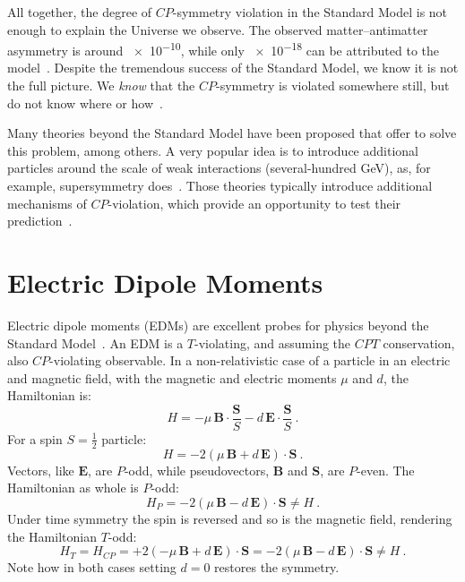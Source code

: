 All together, the degree of $CP$-symmetry violation in the Standard Model is not enough to explain the Universe we observe. The observed matter--antimatter asymmetry is around \num{e-10}, while only \num{e-18} can be attributed to the model~\cite{Riotto1999}. Despite the tremendous success of the Standard Model, we know it is not the full picture. We \emph{know} that the $CP$-symmetry is violated somewhere still, but do not know where or how~\cite{Pospelov2005}.%

Many theories beyond the Standard Model have been proposed that offer to solve this problem, among others. A very popular idea is to introduce additional particles around the scale of weak interactions (several-hundred GeV), as, for example, supersymmetry does~\cite{Supersymmetry}. Those theories typically introduce additional mechanisms of $CP$-violation, which provide an opportunity to test their prediction~\cite{Ellis1989}.



\section{Electric Dipole Moments}
Electric dipole moments (EDMs) are excellent probes for physics beyond the Standard Model~\cite{Pospelov2005}. An EDM is a $T$-violating, and assuming the $CPT$ conservation, also $CP$-violating observable. In a non-relativistic case of a particle in an electric and magnetic field, with the magnetic and electric moments $\mu$ and $d$, the Hamiltonian is:
\begin{equation}
  H = - \mu \, \mathbf{B} \cdot \frac{\mathbf{S}}{S} - d \, \mathbf{E} \cdot \frac{\mathbf{S}}{S} \ .
\end{equation}
For a spin $S = \tfrac{1}{2}$ particle:
\begin{equation}
  H = - 2 \left( \mu \, \mathbf{B} + d \, \mathbf{E} \right ) \cdot \mathbf{S} \ .
\end{equation}
Vectors, like $\mathbf{E}$, are $P$-odd, while pseudovectors, $\mathbf{B}$ and $\mathbf{S}$, are $P$-even. The Hamiltonian as whole is $P$-odd:
\begin{equation}
  H_P = - 2 \left( \mu \, \mathbf{B} - d \, \mathbf{E} \right ) \cdot \mathbf{S} \neq H \ .
\end{equation}
Under time symmetry the spin is reversed and so is the magnetic field, rendering the Hamiltonian $T$-odd:
\begin{equation}
  H_T = H_{CP} = + 2 \left( - \mu \, \mathbf{B} + d \, \mathbf{E} \right ) \cdot \mathbf{S} = - 2 \left( \mu \, \mathbf{B} - d \, \mathbf{E} \right ) \cdot \mathbf{S} \neq H \ .
\end{equation}
Note how in both cases setting $d = 0$ restores the symmetry.

